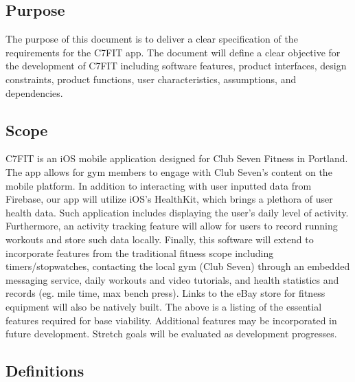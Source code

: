 \documentclass[letterpaper,10pt,titlepage]{article}
\begin{document}
\subsection{Purpose}

The purpose of this document is to deliver a clear specification of the requirements for the C7FIT app. The document will define a clear objective for the development of C7FIT including software features, product interfaces, design constraints, product functions, user characteristics, assumptions, and dependencies.

\subsection{Scope}

C7FIT is an iOS mobile application designed for Club Seven Fitness in Portland. The app allows for gym members to engage with Club Seven’s content on the mobile platform. In addition to interacting with user inputted data from Firebase, our app will utilize iOS’s HealthKit, which brings a plethora of user health data.  Such application includes displaying the user’s daily level of activity. Furthermore, an activity tracking feature will allow for users to record running workouts and store such data locally. Finally, this software will extend to incorporate features from the traditional fitness scope including timers/stopwatches, contacting the local gym (Club Seven) through an embedded messaging service, daily workouts and video tutorials, and health statistics and records (eg. mile time, max bench press). Links to the eBay store for fitness equipment will also be natively built. The above is a listing of the essential features required for base viability. Additional features may be incorporated in future development. Stretch goals will be evaluated as development progresses.

\subsection{Definitions}
\end{document}
